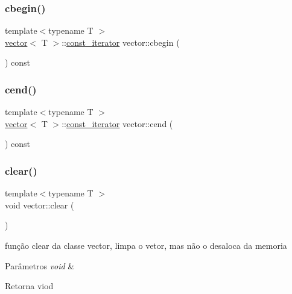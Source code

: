 \mbox{\label{classsc_1_1vector_abf97464250caf4653a104fff421943c8}} 
\subsubsection{\texorpdfstring{cbegin()}{cbegin()}}
{\footnotesize\ttfamily template$<$typename T $>$ \\
\mbox{\hyperlink{classsc_1_1vector}{vector}}$<$ T $>$\+::\mbox{\hyperlink{classsc_1_1vector_1_1const__iterator}{const\+\_\+iterator}} vector\+::cbegin (\begin{DoxyParamCaption}\item[{void}]{ }\end{DoxyParamCaption}) const}

\mbox{\label{classsc_1_1vector_aa6a2e50e9f3eec904cf6ec0f357c8180}} 
\subsubsection{\texorpdfstring{cend()}{cend()}}
{\footnotesize\ttfamily template$<$typename T $>$ \\
\mbox{\hyperlink{classsc_1_1vector}{vector}}$<$ T $>$\+::\mbox{\hyperlink{classsc_1_1vector_1_1const__iterator}{const\+\_\+iterator}} vector\+::cend (\begin{DoxyParamCaption}\item[{void}]{ }\end{DoxyParamCaption}) const}

\mbox{\label{classsc_1_1vector_a8fe7985eb59c7ce5c1165184feebc939}} 
\subsubsection{\texorpdfstring{clear()}{clear()}}
{\footnotesize\ttfamily template$<$typename T $>$ \\
void vector\+::clear (\begin{DoxyParamCaption}{ }\end{DoxyParamCaption})}

função clear da classe vector, limpa o vetor, mas não o desaloca da memoria 
\begin{DoxyParams}{Parâmetros}
{\em void} & \\
\hline
\end{DoxyParams}
\begin{DoxyReturn}{Retorna}
viod 
\end{DoxyReturn}
\mbox{\label{classsc_1_1vector_ae189cd89e598a752b891e55869694f17}} 
